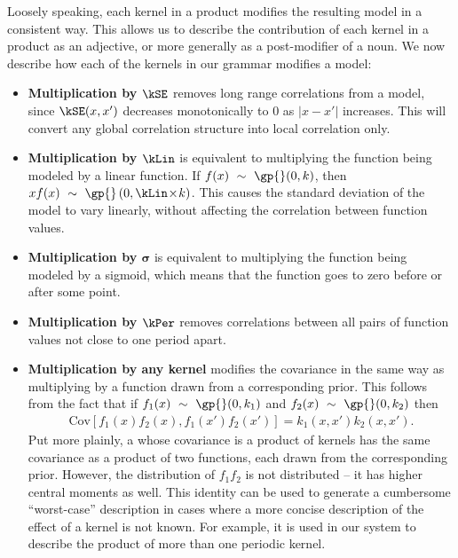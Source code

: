Loosely speaking, each kernel in a product modifies the resulting \gp{} model in a consistent way.
This allows us to describe the contribution of each kernel in a product as an adjective, or more generally as a post-modifier of a noun.
We now describe how each of the kernels in our grammar modifies a \gp{} model:

\begin{itemize}
\item {\bf Multiplication by $\kSE$} removes long range correlations from a model, since $\kSE(x,x')$ decreases monotonically to 0 as $|x - x'|$ increases.
This will convert any global correlation structure into local correlation only.

\item {\bf Multiplication by $\kLin$} is equivalent to multiplying the function being modeled by a linear function.
If $f(x) \dist \gp{}(0, \kernel)$, then $xf(x) \dist \gp{}\left(0, \kLin \kerntimes k \right)$.
This causes the standard deviation of the model to vary linearly, without affecting the correlation between function values.

\item {\bf Multiplication by $\boldsymbol\sigma$} is equivalent to multiplying the function being modeled by a sigmoid, which means that the function goes to zero before or after some point.

\item {\bf Multiplication by $\kPer$}
removes correlations between all pairs of function values not close to one period apart.

\item {\bf Multiplication by any kernel}
modifies the covariance in the same way as multiplying by a function drawn from a corresponding \gp{} prior.
This follows from the fact that if ${f_1(x) \dist \gp{}(0, \kernel_1)}$ and ${f_2(x) \dist \gp{}(0, \kernel_2)}$ then
\begin{align}
{\textrm{Cov} \left[f_1(x)f_2(x), f_1(x')f_2(x') \right] = k_1(x,x')k_2(x,x')}.
\end{align}
Put more plainly, a \gp{} whose covariance is a product of kernels has the same covariance as a product of two functions, each drawn from the corresponding \gp{} prior.
However, the distribution of $f_1 f_2$ is not \gp{} distributed -- it has higher central moments as well.
This identity can be used to generate a cumbersome ``worst-case'' description in cases where a more concise description of the effect of a kernel is not known.
For example, it is used in our system to describe the product of more than one periodic kernel.
\end{itemize}

